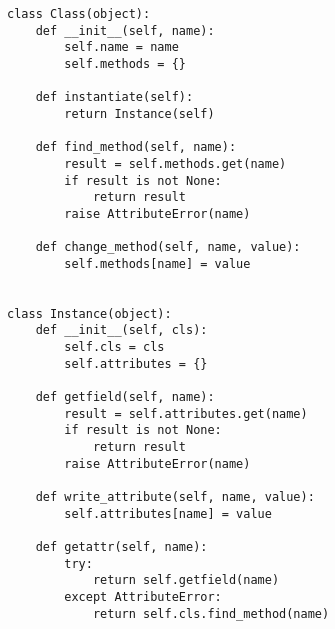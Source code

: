 \begin{lstlisting}[mathescape,basicstyle=\ttfamily]
class Class(object):
    def __init__(self, name):
        self.name = name
        self.methods = {}

    def instantiate(self):
        return Instance(self)

    def find_method(self, name):
        result = self.methods.get(name)
        if result is not None:
            return result
        raise AttributeError(name)

    def change_method(self, name, value):
        self.methods[name] = value


class Instance(object):
    def __init__(self, cls):
        self.cls = cls
        self.attributes = {}

    def getfield(self, name):
        result = self.attributes.get(name)
        if result is not None:
            return result
        raise AttributeError(name)

    def write_attribute(self, name, value):
        self.attributes[name] = value

    def getattr(self, name):
        try:
            return self.getfield(name)
        except AttributeError:
            return self.cls.find_method(name)
\end{lstlisting}

